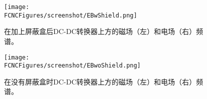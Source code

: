 \begin{figure}[H]
\centering
\texttt{[image: \\FCNCFigures/screenshot/EBwShield.png]}
\caption{在加上屏蔽盒后DC-DC转换器上方的磁场（左）和电场（右）频谱。}
\label{fig:EBwShield}
\end{figure}

\begin{figure}[H]
\centering
\texttt{[image: \\FCNCFigures/screenshot/EBwoShield.png]}
\caption{在没有屏蔽盒时DC-DC转换器上方的磁场（左）和电场（右）频谱。}
\label{fig:EBwoShield}
\end{figure}
